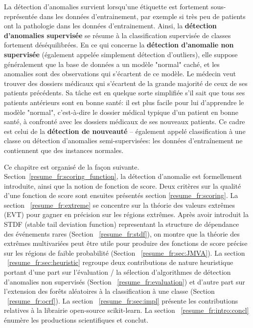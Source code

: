 \documentclass[a4paper, 12pt]{article}
\begin{document}
La détection d'anomalies survient lorsqu'une étiquette est fortement sous-représentée dans les données d'entrainement, par exemple si très peu de patients ont la pathologie dans les données d'entrainement.
Ainsi, la \textbf{détection d'anomalies supervisée} se résume à la classification supervisée de classes fortement déséquilibrées.
En ce qui concerne la \textbf {détection d'anomalie non supervisée} (également appelée simplement détection d'outliers), elle suppose généralement que la base de données a un modèle "normal" caché, et les anomalies sont des observations qui s'écartent de ce modèle. Le médecin veut trouver des dossiers médicaux qui s'écartent de la grande majorité de ceux de ses patients précédents.
%
Sa tâche est en quelque sorte simplifiée s'il sait que tous ses patients antérieurs sont en bonne santé: il est plus facile pour lui d'apprendre le modèle "normal", c'est-à-dire le dossier médical typique d'un patient en bonne santé, à confronté avec les dossiers médicaux de ses nouveaux patients. Ce cadre est celui de la \textbf {détection de nouveauté} -- également appelé classification à une classe ou détection d'anomalies semi-supervisées: les données d'entraînement ne contiennent que des instances normales.

Ce chapitre est organisé de la façon suivante.
Section~\ref{resume_fr:scoring_function}, la détection d'anomalie est formellement introduite, ainsi que la notion de fonction de score.
Deux critères sur la qualité d'une fonction de score sont ensuites présentés section \ref{resume_fr:scoring}.
La section ~\ref{resume_fr:extreme} se concentre sur la théorie des valeurs extrêmes (EVT) pour gagner en précision sur les régions extrêmes. Après avoir introduit la STDF (stable tail deviation function) representant la structure de dépendance des événements rares (Section ~\ref{resume_fr:stdf}), on montre que la théorie des extrêmes multivariées peut être utile pour produire des fonctions de score précise sur les régions de faible probabilité (Section ~\ref{resume_fr:sec:JMVA}).
La section ~\ref{resume_fr:sec:heuristic} regroupe deux contributions de nature heuristique portant d'une part sur l'évaluation / la sélection d'algorithmes de détection d'anomalies non supervisés (Section ~\ref{resume_fr:evaluation}) et d'autre part sur l'extension des forêts aléatoires à la classification à une classe (Section ~\ref{resume_fr:ocrf}). La section ~\ref{resume_fr:sec:impl} présente les contributions relatives à la librairie open-source scikit-learn. La section ~\ref{resume_fr:intro:concl} énumère les productions scientifiques et conclut.
\end{document}
